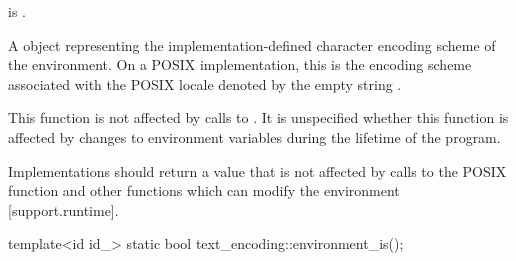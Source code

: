 \documentclass{wg21}
\begin{document}
\begin{addedblock}
\begin{itemdescr}
\mandates {} is .

\returns A  object representing the implementation-defined character encoding scheme of the environment.
On a POSIX implementation, this is the encoding scheme associated with the POSIX locale denoted by the empty string .

\begin{note}
    This function is not affected by calls to .
    It is unspecified whether this function is affected by changes to environment variables during the lifetime of the program.
\end{note}

\recommended Implementations should return a value that is not affected by calls to the POSIX function 
and other functions which can modify the environment [support.runtime].

%
%
%
%
%
%
%
%

\end{itemdescr}

\begin{itemdecl}
template<id id_>
static bool text_encoding::environment_is();
\end{itemdecl}

\begin{itemdescr}
\returns {}
\end{itemdescr}


\end{addedblock}
\end{document}

